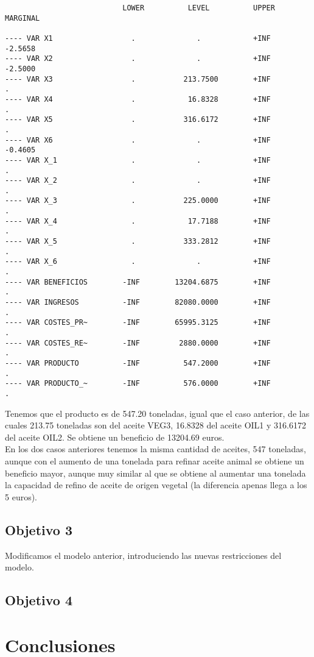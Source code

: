 \documentclass[12pt,a4paper,twoside,openright,titlepage,final]{article}
\begin{document}
\begin{verbatim}
                           LOWER          LEVEL          UPPER         MARGINAL

---- VAR X1                  .              .            +INF           -2.5658      
---- VAR X2                  .              .            +INF           -2.5000      
---- VAR X3                  .           213.7500        +INF             .          
---- VAR X4                  .            16.8328        +INF             .          
---- VAR X5                  .           316.6172        +INF             .          
---- VAR X6                  .              .            +INF           -0.4605      
---- VAR X_1                 .              .            +INF             .          
---- VAR X_2                 .              .            +INF             .          
---- VAR X_3                 .           225.0000        +INF             .          
---- VAR X_4                 .            17.7188        +INF             .          
---- VAR X_5                 .           333.2812        +INF             .          
---- VAR X_6                 .              .            +INF             .          
---- VAR BENEFICIOS        -INF        13204.6875        +INF             .          
---- VAR INGRESOS          -INF        82080.0000        +INF             .          
---- VAR COSTES_PR~        -INF        65995.3125        +INF             .          
---- VAR COSTES_RE~        -INF         2880.0000        +INF             .          
---- VAR PRODUCTO          -INF          547.2000        +INF             .          
---- VAR PRODUCTO_~        -INF          576.0000        +INF             .          
\end{verbatim}

Tenemos que el producto es de 547.20 toneladas, igual que el caso anterior, de las cuales 213.75 toneladas son del aceite VEG3, 16.8328 del aceite OIL1 y 316.6172 del aceite OIL2. Se obtiene un beneficio de 13204.69 euros.\\

En los dos casos anteriores tenemos la misma cantidad de aceites, 547 toneladas, aunque con el aumento de una tonelada para refinar aceite animal se obtiene un beneficio mayor, aunque muy similar al que se obtiene al aumentar una tonelada la capacidad de refino de aceite de origen vegetal (la diferencia apenas llega a los 5 euros).

\subsection{Objetivo 3}

Modificamos el modelo anterior, introduciendo las nuevas restricciones del modelo.

\subsection{Objetivo 4}

\section{Conclusiones}
\end{document}
